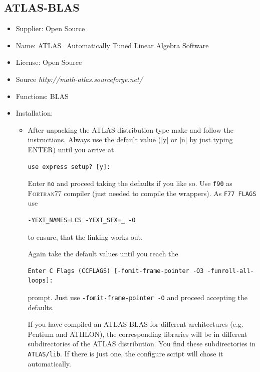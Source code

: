 \documentclass[a4paper,10pt]{report}
\begin{document}
\subsection{ATLAS-BLAS}
\begin{itemize}
\item Supplier: Open Source
\item Name: ATLAS=Automatically Tuned Linear Algebra Software
\item License: Open Source
\item Source \textit{http://math-atlas.sourceforge.net/}
\item Functions: BLAS
\item Installation:
\begin{itemize}
\item 
After unpacking the ATLAS distribution type make and follow the
instructions. Always use the default value ([y] or [n] by just typing
ENTER) until you arrive at
\begin{verbatim}
use express setup? [y]:
\end{verbatim}
Enter \texttt{no} and proceed taking the defaults if you like so.  Use
\texttt{f90} as \textsc{Fortran77} compiler (just needed to compile
the wrappers). As \texttt{F77 FLAGS} use
\begin{verbatim}
-YEXT_NAMES=LCS -YEXT_SFX=_ -O
\end{verbatim}
to ensure, that the linking works out.

Again take the default values until you reach the 
\begin{verbatim}
Enter C Flags (CCFLAGS) [-fomit-frame-pointer -O3 -funroll-all-loops]: 
\end{verbatim}
prompt.  Just use \texttt{-fomit-frame-pointer -O} and proceed accepting the defaults.

If you have compiled an ATLAS BLAS for different architectures (e.g. Pentium
and ATHLON), the corresponding libraries will be in different subdirectories of
the ATLAS distribution. You find these subdirectories in \texttt{ATLAS/lib}.
If there is just one, the configure script will chose it
automatically. 
\end{itemize}
\end{itemize}

\end{document}
